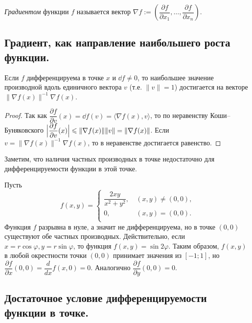 \documentclass[a4paper]{article}
\theoremstyle{named}
\begin{document}
    \begin{definition*}
        {\it Градиентом} функции $f$ называется вектор
        $\nabla f:=\left(\dfrac{\partial f}{\partial x_1},\ldots,\dfrac{\partial f}{\partial x_n}\right)$.
    \end{definition*}

    \subsection{Градиент, как направление наибольшего роста функции.}

    \begin{lemma*}
        Если $f$ дифференцируема в точке $x$ и $\dd f\ne0$, то наибольшее значение производной вдоль единичного вектора
        $v$ (т.е. $\|v\|=1$) достигается на векторе $\|\nabla f(x)\|^{-1}\nabla f(x)$.
    \end{lemma*}

    \begin{proof}
        Так как $\dfrac{\partial f}{\partial v}(x) = \dd f(v) = \langle\nabla f(x), v\rangle$,
        то по неравенству Коши--Буняковского $\Bigl|\dfrac{\partial f}{\partial v}(x)\Bigr|\leq \|\nabla f(x)\|\|v\|
        =\|\nabla f(x)\|$. Если $v=\|\nabla f(x)\|^{-1}\nabla f(x)$, то в неравенстве достигается равенство.
    \end{proof}

    Заметим, что наличия частных производных в точке недостаточно для дифференцируемости функции в этой точке.

    \begin{example*}
        Пусть
        $$
            f(x,y)=
            \left\{
            \begin{aligned}
                \dfrac{2xy}{x^2+y^2}, &\ (x,y)\ne(0,0), \\
                0, &\ (x,y)=(0,0).\\
            \end{aligned}
            \right.
        $$
        Функция $f$ разрывна в нуле, а значит не дифференцируема, но в точке $(0,0)$ существуют обе частных производных.
        Действительно, если $x=r\cos\varphi, y=r\sin\varphi$, то функция $f(x,y) = \sin2\varphi$. Таким образом, $f(x,y)$ в любой окрестности точки $(0,0)$ принимает значения из $[-1; 1]$, но $\dfrac{\partial f}{\partial x}(0,0) = \dfrac{d}{dx}f(x,0) = 0$.
        Аналогично $\dfrac{\partial f}{\partial y}(0,0)=0$.
    \end{example*}

    \subsection{Достаточное условие дифференцируемости функции в точке.}
\end{document}
